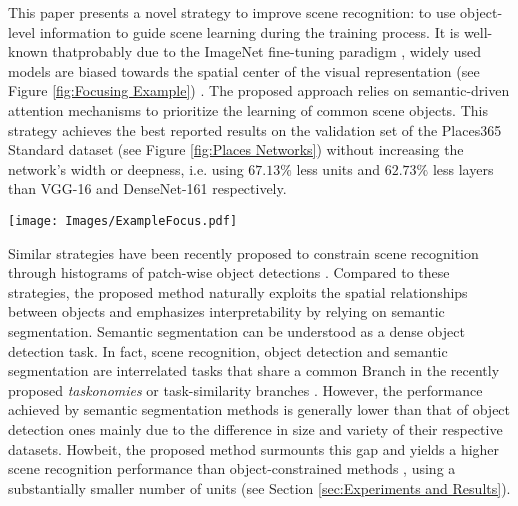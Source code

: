 \documentclass[review, 3p, sort&compress]{elsarticle}
\begin{document}
This paper presents a novel strategy to improve scene recognition: to use object-level information to guide scene learning during the training process. It is well-known that\textemdash probably due to the ImageNet fine-tuning paradigm \cite{he2018rethinking}, widely used models are biased towards the spatial center of the visual representation (see Figure \ref{fig:Focusing Example}) \cite{das2017human}. The proposed approach relies on semantic-driven attention mechanisms to prioritize the learning of common scene objects. This strategy achieves the best reported results on the validation set of the Places365 Standard dataset \cite{zhou2018places} (see Figure \ref{fig:Places Networks}) without increasing the network's width or deepness, i.e. using \(67.13 \%\) less units and \(62.73 \%\) less layers than VGG-16 and DenseNet-161 respectively.

\begin{figure*}[t!]
    \centering
    \texttt{[image: Images/ExampleFocus.pdf]}
    \caption{Scene recognition results depending on the input data. (a) RGB image corresponding to the "Kitchen" scene class. (b) Semantic segmentation from (a) obtained by a state-of-the-art CNN-based algorithm. (c) Class Activation Map (CAM) \cite{zhou2015cnnlocalization} just using the (a) RGB image. (d) CAM just using the (b) semantic segmentation. (e) CAM for the proposed approach, using both (a) and (b). Top@3 predicted classes are included in the top-left corner of images (c) to (e). Better viewed in color.}
    \label{fig:Focusing Example}
\end{figure*}

Similar strategies have been recently proposed to constrain scene recognition through histograms of patch-wise object detections \cite{wang2017weakly,cheng2018scene, jiang2019deep}. Compared to these strategies, the proposed method naturally exploits the spatial relationships between objects and emphasizes interpretability by relying on semantic segmentation. Semantic segmentation can be understood as a dense object detection task. In fact, scene recognition, object detection and semantic segmentation are interrelated tasks that share a common Branch in the recently proposed \textit{taskonomies} or task-similarity branches \cite{zamir2018taskonomy}.  However, the performance achieved by semantic segmentation methods is generally lower than that of object detection ones mainly due to the difference in size and variety of their respective datasets. Howbeit, the proposed method surmounts this gap and yields a higher scene recognition performance than object-constrained methods \cite{wang2017weakly,cheng2018scene}, using a substantially smaller number of units (see Section \ref{sec:Experiments and Results}).
\end{document}
